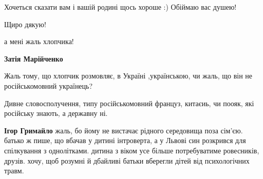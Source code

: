 \begin{itemize}
 
Хочеться сказати вам і вашій родині щось хороше :) Обіймаю вас душею!

 
Щиро дякую!

 
а мені жаль хлопчика!

\begin{itemize}
 
\textbf{Затія Марійченко}

Жаль тому, що хлопчик розмовляє, в Україні ,українською, чи жаль, що він не
російськомовний українець?

Дивне словосполучення, типу російськомовний француз, китаєиь, чи поояк, які
російську знають, а державну ні.


 
\textbf{Ігор Гримайло} жаль, бо йому не вистачає рідного середовища поза
сім'єю. батько ж пише, що вбачав у дитині інтроверта, а у Львові син розкрився
для спілкування з однолітками. дитина з віком усе більше потребуватиме
ровесників, друзів. хочу, щоб розумні й дбайливі батьки вберегли дітей від
психологічних травм.

 

\end{itemize}
\end{itemize}
